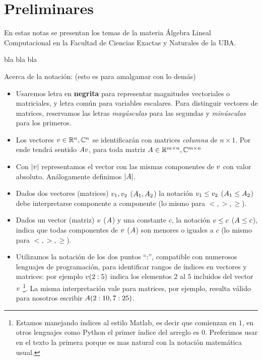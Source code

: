 \chapter*{Preliminares }

En estas notas se presentan los temas de la materia Álgebra Lineal Computacional
en la Facultad de Ciencias Exactas y Naturales de la UBA.

bla bla bla


\bigskip


Acerca de la notación: (esto es para amalgamar con lo demás)
\begin{itemize}
\item Usaremos letra en {\bf negrita} para representar magnitudes vectoriales o matriciales, y letra común para variables escalares. Para distinguir vectores de matrices, reservamos las letras \emph{mayúsculas} para las segundas y \emph{minúsculas} para los primeros.
 \item Los vectores $\vb\in \R^n,\C^n$ se identificarán con matrices \emph{columna} de $n\times 1$. Por ende tendrá sentido
 $\Ab\vb$, para toda matriz $\Ab\in \R^{m\times n},\C^{m\times n}$
 \item Con $|\vb|$ representamos el vector con las mismas componentes de $\vb$ con valor absoluto. Análogamente definimos $|\Ab|$.
 \item Dados dos vectores (matrices) $\vb_1,\vb_2$ ($\Ab_1,\Ab_2$) la notación
 $\vb_1\le \vb_2$ ($\Ab_1\le \Ab_2$) debe interpretarse componente a componente (lo mismo para $<,>,\ge$).
 \item Dados un vector (matriz) $\vb$ ($\Ab$) y una constante $c$, la notación
 $\vb\le c$ ($\Ab\le c$), indica que todas componentes de $\vb$ ($\Ab$) son menores o iguales a $c$  (lo mismo para $<,>,\ge$).
 \item Utilizamos la notación de los dos puntos ``:'', compatible con numerosos lenguajes de programación, para identificar rangos de índices en vectores y matrices: por ejemplo $\vb(2:5)$ indica los elementos $2$ al $5$ incluidos del vector $\vb$ \footnote{Estamos manejando índices al estilo Matlab, es decir que comienzan en $1$, en otros lenguajes como Python el primer índice del arreglo es $0$. Preferimos usar en el texto la primera porque es mas natural con la notación matemática usual.}. La misma interpretación vale para matrices, por ejemplo, resulta válido para nosotros escribir $\Ab(2:10,7:25)$.

\end{itemize}
